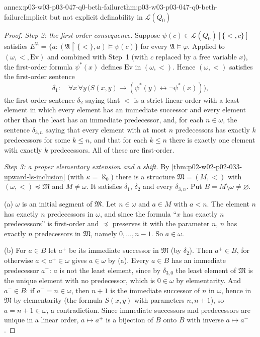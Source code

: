 \begin{annexitem}{annex:p03-w03-p03-047-q0-beth-failure}{thm:p03-w03-p03-047-q0-beth-failure}{Implicit but not explicit definability in \(\mathscr L(Q_0)\)}
\begin{proof}
\emph{Step 2: the first-order consequence.}  Suppose
\(\psi(c)\in\mathscr L(Q_0)[\{<,c\}]\) satisfies
\(E^{\mathfrak A}=\{a:(\mathfrak A\restriction\{<\},a)\models\psi(c)\}\)
for every \(\mathfrak A\models\varphi\).  Applied to
\((\omega,<,\mathrm{Ev})\) and combined with Step~1 (with \(c\) replaced by a
free variable \(x\)), the first-order formula \(\psi^*(x)\) defines
\(\mathrm{Ev}\) in \((\omega,<)\).  Hence \((\omega,<)\) satisfies the
first-order sentence
\[
 \delta_1:\quad\forall x\,\forall y\,\bigl(S(x,y)\to(\psi^*(y)\leftrightarrow\neg\psi^*(x))\bigr),
\]
the first-order sentence \(\delta_2\) saying that \(<\) is a strict linear
order with a least element in which every element has an immediate
successor and every element other than the least has an immediate
predecessor,
and, for each \(n\in\omega\), the sentence \(\delta_{3,n}\) saying that every
element with at most \(n\) predecessors has exactly \(k\) predecessors for
some \(k\le n\), and that for each \(k\le n\) there is exactly one element
with exactly \(k\) predecessors.  All of these are first-order.

\emph{Step 3: a proper elementary extension and a shift.}  By
\cref{thm:p02-w02-p02-033-upward-ls-inclusion} (with \(\kappa=\aleph_0\))
there is a structure \(\mathfrak M=(M,<)\) with
\((\omega,<)\preccurlyeq\mathfrak M\) and \(M\ne\omega\).  It satisfies
\(\delta_1\), \(\delta_2\) and every \(\delta_{3,n}\).  Put
\(B=M\setminus\omega\ne\varnothing\).

(a) \(\omega\) is an initial segment of \(\mathfrak M\).  Let \(n\in\omega\)
and \(a\in M\) with \(a<n\).  The element \(n\) has exactly \(n\)
predecessors in \(\omega\), and since the formula ``\(x\) has exactly \(n\)
predecessors'' is first-order and \(\preccurlyeq\) preserves it with the
parameter \(n\), \(n\) has exactly \(n\) predecessors in \(\mathfrak M\),
namely \(0,\ldots,n-1\).  So \(a\in\omega\).

(b) For \(a\in B\) let \(a^+\) be its immediate successor in \(\mathfrak M\)
(by \(\delta_2\)).  Then \(a^+\in B\), for otherwise \(a<a^+\in\omega\)
gives \(a\in\omega\) by (a).  Every \(a\in B\) has an immediate predecessor
\(a^-\): \(a\) is not the least element, since by \(\delta_{3,0}\) the least
element of \(\mathfrak M\) is the unique element with no predecessor, which
is \(0\in\omega\) by elementarity.  And \(a^-\in B\): if \(a^-=n\in\omega\),
then \(n+1\) is the immediate successor of \(n\) in \(\omega\), hence in
\(\mathfrak M\) by elementarity (the formula \(S(x,y)\) with parameters
\(n,n+1\)), so \(a=n+1\in\omega\), a contradiction.  Since immediate
successors and predecessors are unique in a linear order, \(a\mapsto a^+\)
is a bijection of \(B\) onto \(B\) with inverse \(a\mapsto a^-\).


\end{proof}
\end{annexitem}
